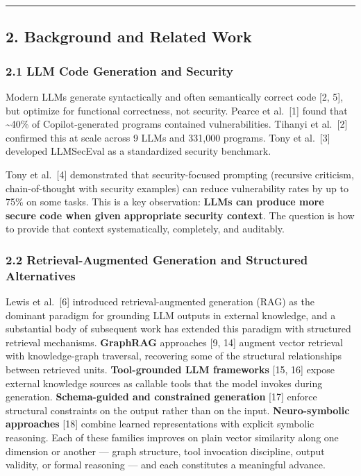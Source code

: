 \documentclass[
]{article}
\begin{document}
\begin{center}\rule{0.5\linewidth}{0.5pt}\end{center}

\subsection{2. Background and Related
Work}\label{background-and-related-work}

\subsubsection{2.1 LLM Code Generation and
Security}\label{llm-code-generation-and-security}

Modern LLMs generate syntactically and often semantically correct code
{[}2, 5{]}, but optimize for functional correctness, not security.
Pearce et al.~{[}1{]} found that \textasciitilde40\% of
Copilot-generated programs contained vulnerabilities. Tihanyi et
al.~{[}2{]} confirmed this at scale across 9 LLMs and 331,000 programs.
Tony et al.~{[}3{]} developed LLMSecEval as a standardized security
benchmark.

Tony et al.~{[}4{]} demonstrated that security-focused prompting
(recursive criticism, chain-of-thought with security examples) can
reduce vulnerability rates by up to 75\% on some tasks. This is a key
observation: \textbf{LLMs can produce more secure code when given
appropriate security context}. The question is how to provide that
context systematically, completely, and auditably.

\subsubsection{2.2 Retrieval-Augmented Generation and Structured
Alternatives}\label{retrieval-augmented-generation-and-structured-alternatives}

Lewis et al.~{[}6{]} introduced retrieval-augmented generation (RAG) as
the dominant paradigm for grounding LLM outputs in external knowledge,
and a substantial body of subsequent work has extended this paradigm
with structured retrieval mechanisms. \textbf{GraphRAG} approaches {[}9,
14{]} augment vector retrieval with knowledge-graph traversal,
recovering some of the structural relationships between retrieved units.
\textbf{Tool-grounded LLM frameworks} {[}15, 16{]} expose external
knowledge sources as callable tools that the model invokes during
generation. \textbf{Schema-guided and constrained generation} {[}17{]}
enforce structural constraints on the output rather than on the input.
\textbf{Neuro-symbolic approaches} {[}18{]} combine learned
representations with explicit symbolic reasoning. Each of these families
improves on plain vector similarity along one dimension or another ---
graph structure, tool invocation discipline, output validity, or formal
reasoning --- and each constitutes a meaningful advance.
\end{document}
